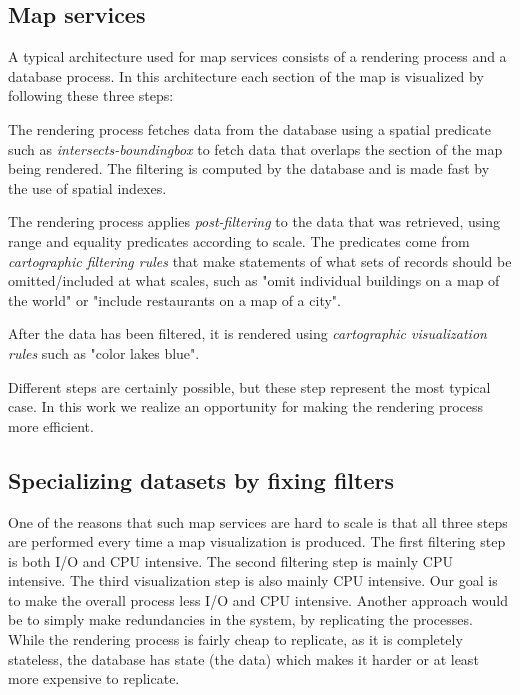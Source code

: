\subsection{Map services}

A typical architecture used for map services consists of a rendering process and a database process. In this architecture each section of the map is visualized by following these three steps:

 The rendering process fetches data from the database using a spatial predicate such as \emph{intersects-boundingbox} to fetch data that overlaps the section of the map being rendered. The filtering is computed by the database and is made fast by the use of spatial indexes.

 The rendering process applies \emph{post-filtering} to the data that was retrieved, using range and equality predicates according to scale. The predicates come from \emph{cartographic filtering rules} that make statements of what sets of records should be omitted/included at what scales, such as "omit individual buildings on a map of the world" or "include restaurants on a map of a city".

 After the data has been filtered, it is rendered using \emph{cartographic visualization rules} such as "color lakes blue".

Different steps are certainly possible, but these step represent the most typical case. In this work we realize an opportunity for making the rendering process more efficient. 


\subsection{Specializing datasets by fixing filters}
One of the reasons that such map services are hard to scale is that all three steps are performed every time a map visualization is produced. The first filtering step is both I/O and CPU intensive. The second filtering step is mainly CPU intensive. The third visualization step is also mainly CPU intensive. Our goal is to make the overall process less I/O and CPU intensive. Another approach would be to simply make redundancies in the system, by replicating the processes. While the rendering process is fairly cheap to replicate, as it is completely stateless, the database has state (the data) which makes it harder or at least more expensive to replicate.

